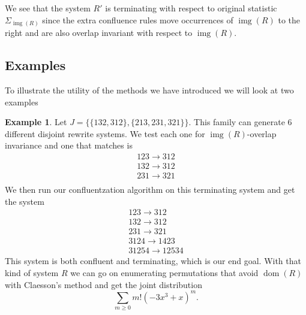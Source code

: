 \documentclass[a4paper, 11pt, english]{article}
\newcommand{\patternrule}{ \to \!}
\theoremstyle{definition}
\newtheorem{example}[theorem]{Example}
\DeclareMathOperator{\dom}{dom}
\DeclareMathOperator{\img}{img}
\begin{document}
We see that the system $R'$ is terminating with respect to original statistic $\Sigma_{\img(R)}$
since the extra confluence rules move occurrences of $\img(R)$ to the right and are also overlap
invariant with respect to $\img(R)$.

\subsection{Examples}
To illustrate the utility of the methods we have introduced we will look at two
examples

\begin{example}
Let $J=\{\{ 132, 312 \}, \{ 213, 231, 321 \}\}$. This family can generate 6
different disjoint rewrite systems. We test each one for $\img(R)$-overlap invariance 
and one that matches is 
\[
    \begin{matrix}
        123 \patternrule 312 \\
        132 \patternrule 312 \\
        231 \patternrule 321 \\
    \end{matrix}
\]
We then run our confluentzation algorithm on this terminating system
and get the system
\[
    \begin{matrix}
        123 \patternrule 312 \\
        132 \patternrule 312 \\
        231 \patternrule 321 \\
        3124 \patternrule 1423 \\
        31254 \patternrule 12534
    \end{matrix}
\]
This system is both confluent and terminating, which is our end goal.
With that kind of system $R$ we can go on enumerating
permutations that avoid $\dom(R)$ with Claesson's method and get the joint distribution
\[
  \sum_{m \geq 0} m! (-3x^3 + x)^m.
\]
 
\end{example}
\end{document}
